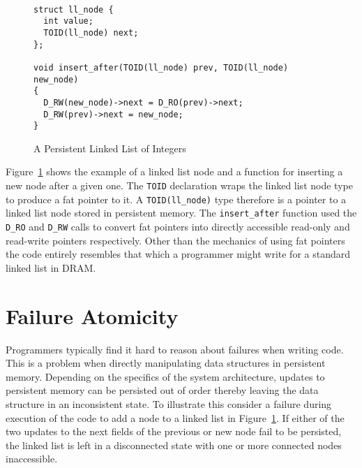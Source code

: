 \documentclass[twocolumn]{article}
\begin{document}
\begin{figure}
{\scriptsize
\begin{verbatim}

struct ll_node {
  int value;
  TOID(ll_node) next;
};

void insert_after(TOID(ll_node) prev, TOID(ll_node) new_node)
{
  D_RW(new_node)->next = D_RO(prev)->next;
  D_RW(prev)->next = new_node;
}

\end{verbatim}
}
\caption{A Persistent Linked List of Integers}
\label{fig:example}
\end{figure}

Figure~\ref{fig:example} shows the example of a linked list node and a function
for inserting a new node after a given one. The {\tt TOID} declaration wraps the
linked list node type to produce a fat pointer to it. A {\tt TOID(ll\_node)}
type therefore is a pointer to a linked list node stored in persistent memory.
The {\tt insert\_after} function used the {\tt D\_RO} and {\tt D\_RW} calls to
convert fat pointers into directly accessible read-only and read-write pointers
respectively. Other than the mechanics of using fat pointers the code entirely
resembles that which a programmer might write for a standard linked list in
DRAM.

\section{Failure Atomicity}
Programmers typically find it hard to reason about failures when writing
code. This is a problem when directly manipulating data structures in persistent
memory. Depending on the specifics of the system architecture, updates to
persistent memory can be persisted out of order thereby leaving  the data
structure in an inconsistent state. To illustrate this consider a failure during
execution of the code to add a node to a linked list in
Figure~\ref{fig:example}. If either of the two updates to the next fields of the
previous or new node fail to be persisted, the linked list is left in a
disconnected state with one or more connected nodes inaccessible.
\end{document}
